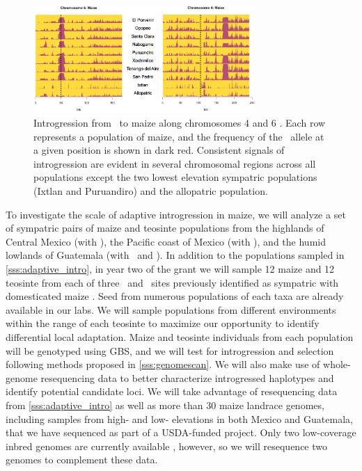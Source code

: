 \begin{figure}[t]
  \centering
   \includegraphics[width=0.75\textwidth]{same_regions}
    \caption{ Introgression from \zm\ to maize along chromosomes 4 and 6 \citep{Hufford2013}. Each row represents a population of maize, and the frequency of the \zm\ allele at a given position is shown in dark red. Consistent signals of introgression are evident in several chromosomal regions across all populations except the two lowest elevation sympatric populations (Ixtlan and Puruandiro) and the allopatric population.}
\label{fig:sameregions}
\end{figure} 

To investigate the scale of adaptive introgression in maize, we will analyze a set of sympatric pairs of maize and teosinte populations from the highlands of Central Mexico (with \zm), the Pacific coast of Mexico (with \zp), and the humid lowlands of Guatemala (with \zl\ and \zh). 
In addition to the populations sampled in \ref{sss:adaptive_intro}, in year two of the grant we will sample 12 maize and 12 teosinte from each of three \zm\ and \zp\ sites previously identified as sympatric with domesticated maize \citep{hufford2010genetic, Hufford2013}.  
Seed from numerous populations of each taxa are already available in our labs.
We will sample populations from different environments within the range of each teosinte to maximize our opportunity to identify differential local adaptation.
Maize and teosinte individuals from each population will be genotyped using GBS, and we will test for introgression and selection following methods proposed in \ref{sss:genomescan}.
We will also make use of whole-genome resequencing data to better characterize introgressed haplotypes and identify potential candidate loci. 
We will take advantage of resequencing data from \ref{sss:adaptive_intro} as well as more than 30 maize landrace genomes, including samples from high- and low- elevations in both Mexico and Guatemala, that we have sequenced as part of a USDA-funded project.  
Only two low-coverage inbred \zm{} genomes are currently available \citep{Chia2012a}, however, so we will resequence two \zm{} genomes to complement these data.

